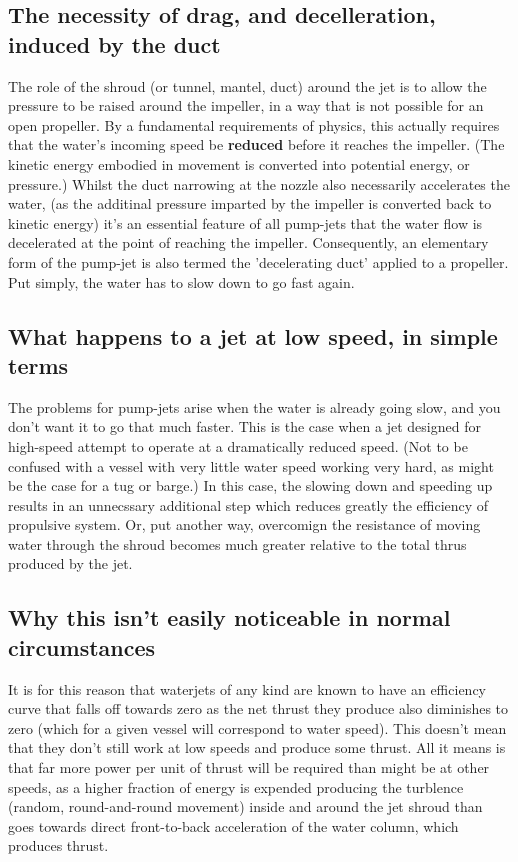\documentclass{article}\usepackage[]{graphicx}\usepackage[]{color}
\begin{document}
\subsection{The necessity of drag, and decelleration, induced by the duct}

The role of the shroud (or tunnel, mantel, duct) around the jet is to allow the pressure to be raised around the impeller, in a way that is not possible for an open propeller.  By a fundamental requirements of physics, this actually requires that the water's incoming speed be \textbf{reduced} before it reaches the impeller. (The kinetic energy embodied in movement is converted into potential energy, or pressure.)  Whilst the duct narrowing at the nozzle also necessarily accelerates the water, (as the additinal pressure imparted by the impeller is converted back to kinetic energy) it's an essential feature of all pump-jets that the water flow is decelerated at the point of reaching the impeller. Consequently, an elementary form of the pump-jet is also termed the 'decelerating duct' applied to a propeller.  Put simply, the water has to slow down to go fast again.



\subsection{What happens to a jet at low speed, in simple terms}

The problems for pump-jets arise when the water is already going slow, and you don't want it to go that much faster.  This is the case when a jet designed for high-speed attempt to operate at a dramatically reduced speed.  (Not to be confused with a vessel with very little water speed working very hard, as might be the case for a tug or barge.)  In this case, the slowing down and speeding up results in an unnecssary additional step which reduces greatly the efficiency of propulsive system. Or, put another way, overcomign the resistance of moving water through the shroud becomes much greater relative to the total thrus produced by the jet.

\subsection{Why this isn't easily noticeable in normal circumstances}

It is for this reason that waterjets of any kind are known to have an efficiency curve that falls off towards zero as the net thrust they produce also diminishes to zero (which for a given vessel will correspond to water speed).  This doesn't mean that they don't still work at low speeds and produce some thrust.  All it means is that far more power per unit of thrust will be required than might be at other speeds, as a higher fraction of energy is expended producing the turblence (random, round-and-round movement) inside and around the jet shroud than goes towards direct front-to-back acceleration of the water column, which produces thrust.
\end{document}

